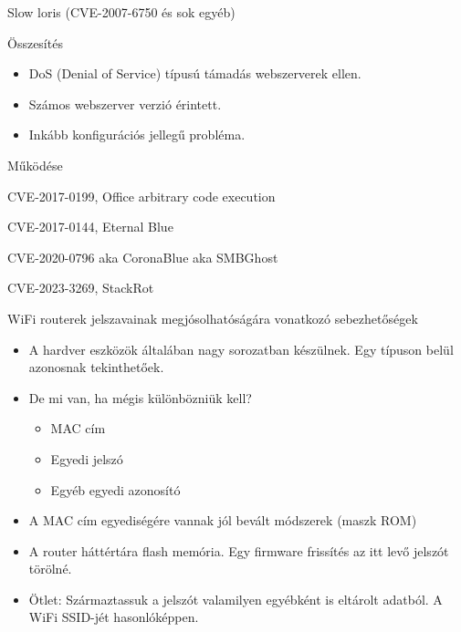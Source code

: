 \documentclass[12 pt]{beamer}
\begin{document}
\begin{frame}{Slow loris (CVE-2007-6750 és sok egyéb)}
  \begin{block}{Összesítés}
  \begin{itemize}
    \item{DoS (Denial of Service) típusú támadás webszerverek ellen.}
    \item{Számos webszerver verzió érintett.}
    \item{Inkább konfigurációs jellegű probléma.}
  \end{itemize}
  \end{block}

  \begin{block}{Működése}
  \end{block}

  

\end{frame}


\begin{frame}{CVE-2017-0199, Office arbitrary code execution}
\end{frame}

\begin{frame}{CVE-2017-0144, Eternal Blue}
\end{frame}

\begin{frame}{CVE-2020-0796 aka CoronaBlue aka SMBGhost}
\end{frame}

\begin{frame}{CVE-2023-3269, StackRot}
\end{frame}

\begin{frame}{WiFi routerek jelszavainak megjósolhatóságára vonatkozó sebezhetőségek}
  \begin{itemize}
    \item{A hardver eszközök általában nagy sorozatban készülnek. Egy típuson belül azonosnak tekinthetőek.}
    \item{De mi van, ha mégis különbözniük kell?}
      \begin{itemize}
        \item{MAC cím}
        \item{Egyedi jelszó}
        \item{Egyéb egyedi azonosító}
      \end{itemize}
    \item{A MAC cím egyediségére vannak jól bevált módszerek (maszk ROM)}
    \item{A router háttértára flash memória. Egy firmware frissítés az itt levő jelszót törölné.}
    \item{Ötlet: Származtassuk a jelszót valamilyen egyébként is eltárolt adatból. A WiFi SSID-jét hasonlóképpen.}
  \end{itemize}
\end{frame}
\end{document}
